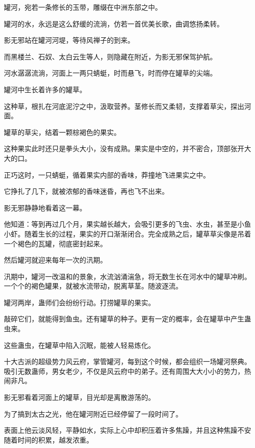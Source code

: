
\begin{this_body}



罐河，宛若一条修长的玉带，雕缀在中洲东部之中。

罐河的水，永远是这么舒缓的流淌，仿若一首优美长歌，曲调悠扬柔转。

影无邪站在罐河河堤，等待风禅子的到来。

而黑楼兰、石奴、太白云生等人，则隐藏在附近，为影无邪保驾护航。

河水潺潺流淌，河面上一两只蜻蜓，时而悬飞，时而停在罐草的尖端。

罐河中生长着许多的罐草。

这种草，根扎在河底泥泞之中，汲取营养。茎修长而又柔韧，支撑着草尖，探出河面。

罐草的草尖，结着一颗棕褐色的果实。

这种果实此时还只是拳头大小，没有成熟。果实是中空的，并不密合，顶部张开大大的口。

正巧这时，一只蜻蜓，循着果实内部的香味，莽撞地飞进果实之中。

它挣扎了几下，就被浓郁的香味迷昏，再也飞不出来。

影无邪静静地看着这一幕。

他知道：等到再过几个月，果实越长越大，会吸引更多的飞虫、水虫，甚至是小鱼小虾。随着生长的过程，果实的开口渐渐闭合。完全成熟之后，罐草草尖像是吊着一个褐色的瓦罐，彻底密封起来。

然后罐河就迎来每年一次的汛期。

汛期中，罐河一改温和的景象，水流汹涌湍急，将无数生长在河水中的罐草冲刷。一个个的褐色罐果，就被水流带动，脱离草茎。随波逐流。

罐河两岸，蛊师们会纷纷行动。打捞罐草的果实。

敲碎它们，就能得到鱼虫。还有罐草的种子。更有一定的概率，会在罐草中产生蛊虫来。

这些蛊虫，在罐草中陷入沉眠，能被人轻易炼化。

十大古派的超级势力风云府，掌管罐河，每到这个时候，都会组织一场罐河祭典。吸引无数蛊师，男女老少，不仅是风云府中的弟子。还有周围大大小小的势力，热闹非凡。

影无邪看着河面上的罐草，目光却是离散游荡的。

为了搞到太古之光，他在罐河附近已经停留了一段时间了。

表面上他云淡风轻，平静如水，实际上心中却积压着许多焦躁，并且这种焦躁不安随着时间的积累，越发浓重。


\end{this_body}
